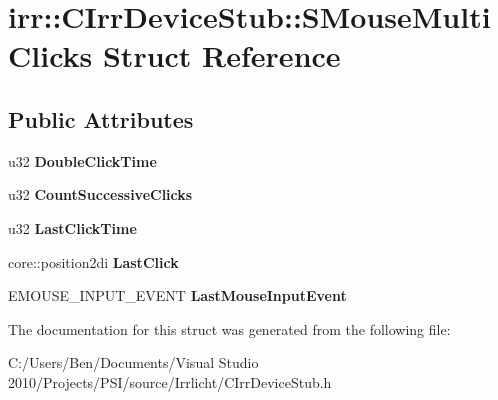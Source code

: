 \hypertarget{structirr_1_1_c_irr_device_stub_1_1_s_mouse_multi_clicks}{\section{irr\-:\-:C\-Irr\-Device\-Stub\-:\-:S\-Mouse\-Multi\-Clicks Struct Reference}
\label{structirr_1_1_c_irr_device_stub_1_1_s_mouse_multi_clicks}
}
\subsection*{Public Attributes}
\begin{DoxyCompactItemize}
\item 
\hypertarget{structirr_1_1_c_irr_device_stub_1_1_s_mouse_multi_clicks_a83c16e07875755a4562f8e6b47379833}{u32 {\bfseries Double\-Click\-Time}}\label{structirr_1_1_c_irr_device_stub_1_1_s_mouse_multi_clicks_a83c16e07875755a4562f8e6b47379833}

\item 
\hypertarget{structirr_1_1_c_irr_device_stub_1_1_s_mouse_multi_clicks_a7c23a445a079c8e699b4bdb6e10bf493}{u32 {\bfseries Count\-Successive\-Clicks}}\label{structirr_1_1_c_irr_device_stub_1_1_s_mouse_multi_clicks_a7c23a445a079c8e699b4bdb6e10bf493}

\item 
\hypertarget{structirr_1_1_c_irr_device_stub_1_1_s_mouse_multi_clicks_a94c8ee0404d5e289821aeca390bb4e85}{u32 {\bfseries Last\-Click\-Time}}\label{structirr_1_1_c_irr_device_stub_1_1_s_mouse_multi_clicks_a94c8ee0404d5e289821aeca390bb4e85}

\item 
\hypertarget{structirr_1_1_c_irr_device_stub_1_1_s_mouse_multi_clicks_af5c44850d4ceca66d87bf2e6489e2088}{core\-::position2di {\bfseries Last\-Click}}\label{structirr_1_1_c_irr_device_stub_1_1_s_mouse_multi_clicks_af5c44850d4ceca66d87bf2e6489e2088}

\item 
\hypertarget{structirr_1_1_c_irr_device_stub_1_1_s_mouse_multi_clicks_a384df35fc3f37050bd6b84559a41fdd5}{E\-M\-O\-U\-S\-E\-\_\-\-I\-N\-P\-U\-T\-\_\-\-E\-V\-E\-N\-T {\bfseries Last\-Mouse\-Input\-Event}}\label{structirr_1_1_c_irr_device_stub_1_1_s_mouse_multi_clicks_a384df35fc3f37050bd6b84559a41fdd5}

\end{DoxyCompactItemize}


The documentation for this struct was generated from the following file\-:\begin{DoxyCompactItemize}
\item 
C\-:/\-Users/\-Ben/\-Documents/\-Visual Studio 2010/\-Projects/\-P\-S\-I/source/\-Irrlicht/C\-Irr\-Device\-Stub.\-h\end{DoxyCompactItemize}
